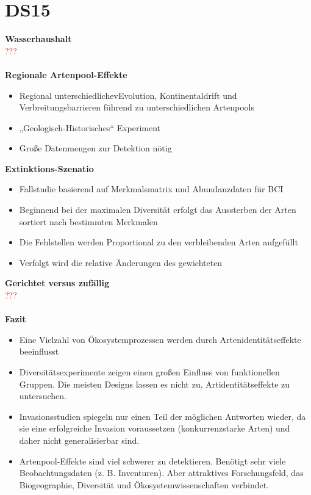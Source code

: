 \section{DS15}

\textbf{Wasserhaushalt}\\
\textcolor{red}{???}
\\\\
\textbf{Regionale Artenpool-Effekte}
\begin{itemize}
	\item Regional unterschiedlichevEvolution, Kontinentaldrift und Verbreitungsbarrieren führend zu unterschiedlichen Artenpools
	\item „Geologisch-Historisches“ Experiment
	\item Große Datenmengen zur Detektion nötig
\end{itemize}

\textbf{Extinktions-Szenatio}
\begin{itemize}
	\item Fallstudie basierend auf Merkmalsmatrix und Abundanzdaten für BCI
	\item Beginnend bei der maximalen Diversität erfolgt das Aussterben der Arten sortiert nach bestimmten Merkmalen
	\item Die Fehlstellen werden Proportional zu den verbleibenden Arten aufgefüllt
	\item Verfolgt wird die relative Änderungen des gewichteten
\end{itemize}

\textbf{Gerichtet versus zufällig}\\
\textcolor{red}{???}
\\\\
\textbf{Fazit}
\begin{itemize}
	\item Eine Vielzahl von Ökosystemprozessen werden durch Artenidentitätseffekte beeinflusst
	\item Diversitätsexperimente zeigen einen großen Einfluss von funktionellen Gruppen. Die meisten Designs lassen es nicht zu, Artidentitätseffekte zu untersuchen.
	\item Invasionsstudien spiegeln nur einen Teil der möglichen Antworten wieder, da sie eine erfolgreiche Invasion voraussetzen (konkurrenzstarke Arten) und daher nicht generalisierbar sind.
	\item Artenpool-Effekte sind viel schwerer zu detektieren. Benötigt sehr viele Beobachtungsdaten (z. B. Inventuren). Aber attraktives Forschungsfeld, das Biogeographie, Diversität und Ökosystemwissenschaften verbindet.
\end{itemize}